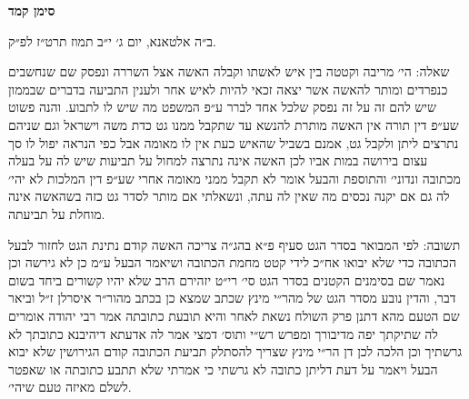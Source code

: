\documentclass[12pt, openany]{book}
\newcommand{\chapname}{}
\newcommand{\newchap}[1]{
	\addcontentsline{toc}{chapter}{#1}
	\renewcommand{\chapname}{#1}
		\begin{center}
			\textbf{%
\fontsize{16pt}{16pt}\selectfont
				#1}
		\end{center}
}
\begin{document}
\newchap{סימן קמד}
\begin{multicols}{2}
ב״ה אלטאנא, יום ג׳ י״ב תמוז תרט״ז לפ״ק.\\\vspace{0pt}

שאלה: הי׳ מריבה וקטטה בין איש לאשתו וקבלה האשה אצל השררה ונפסק שם שנחשבים כנפרדים ומותר להאשה אשר יצאה זכאי להיות לאיש אחר ולענין התביעה בדברים שבממון שיש להם זה על זה נפסק שלכל אחד לברר ע״פ המשפט מה שיש לו לתבוע. והנה פשוט שע״פ דין תורה אין האשה מותרת להנשא עד שתקבל ממנו גט כדת משה וישראל וגם שניהם נתרצים ליתן ולקבל גט, אמנם בשביל שהאיש כעת אין לו מאומה אבל כפי הנראה יפול לו סך עצום בירושה במות אביו לכן האשה אינה נתרצה למחול על תביעות שיש לה על בעלה מכתובה ונדוני׳ והתוספת והבעל אומר לא תקבל ממני מאומה אחרי שע״פ דין המלכות לא יהי׳ לה גם אם יקנה נכסים מה שאין לה עתה, ונשאלתי אם מותר לסדר גט כזה בשהאשה אינה מוחלת על תביעתה.\\\vspace{0pt}

תשובה: לפי המבואר בסדר הגט סעיף פ״א בהג״ה צריכה האשה קודם נתינת הגט לחזור לבעל הכתובה כדי שלא יבואו אח״כ לידי קטט מחמת הכתובה ושיאמר הבעל ע״מ כן לא גירשה וכן נאמר שם בסימנים הקטנים בסדר הגט סי׳ רי״ט יזהירם הרב שלא יהיו קשורים ביחד בשום דבר, והדין נובע מסדר הגט של מהר״י מינץ שכתב שמצא כן בכתב מהור״ר איסרלן ז״ל וביאר שם הטעם מהא דתנן פרק השולח נשאת לאחר והיא תובעת כתובתה אמר רבי יהודה אומרים לה שתיקתך יפה מדיבורך ומפרש רש״י ותוס׳ דמצי אמר לה אדעתא דיהיבנא כתובתך לא גרשתיך וכן הלכה לכן דן הר״י מינץ שצריך להסתלק תביעת הכתובה קודם הגירושין שלא יבוא הבעל ויאמר על דעת דליתן כתובה לא גרשתי כי אמרתי שלא תתבע כתובתה או שאפטר לשלם מאיזה טעם שיהי׳.\\\vspace{0pt}


\end{multicols}
\end{document}

